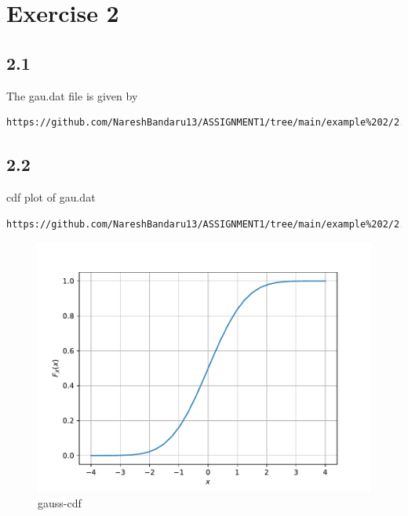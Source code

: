\documentclass[journal,12pt,twocolumn]{IEEEtran}
\begin{document}
\section*{Exercise 2}

\subsection*{2.1}
The gau.dat file is given by
\begin{lstlisting}
https://github.com/NareshBandaru13/ASSIGNMENT1/tree/main/example%202/2.1
\end{lstlisting}

\subsection*{2.2}
cdf plot of gau.dat
\begin{lstlisting}
https://github.com/NareshBandaru13/ASSIGNMENT1/tree/main/example%202/2.2
\end{lstlisting}
\begin{figure}[H]
    \centering
    \includegraphics[scale=0.5]{figures/gauss_cdf.pdf} 
    \caption{gauss-cdf}
    \label{fig:my_cdfgau}
\end{figure}
\end{document}
